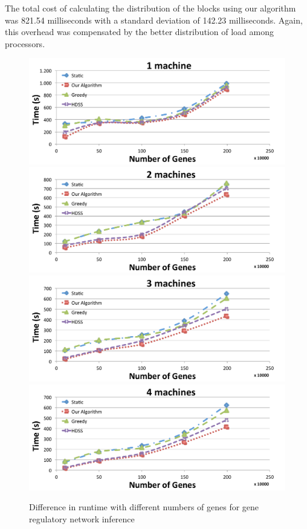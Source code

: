 \documentclass[journal]{IEEEtran}
\begin{document}
The total cost of calculating the distribution of the blocks using our algorithm
was 821.54 milliseconds with a standard deviation of 142.23 milliseconds. Again,
this overhead was compensated by the better distribution of load among
processors.


\begin{figure}[htb]
	\begin{center}
	\centering
		\includegraphics[scale=0.3]{1machineGenes.pdf} \quad
		\includegraphics[scale=0.3]{2machineGenes.pdf} \quad
		\includegraphics[scale=0.3]{3machineGenes.pdf} \quad
		\includegraphics[scale=0.3]{4machineGenes.pdf} 
	\caption{Difference in runtime with different numbers of genes for gene regulatory network inference}
	\label{fig:Gene}
	\end{center}
\end{figure}
\end{document}
